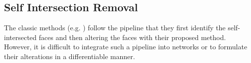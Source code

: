 \subsection{Self Intersection Removal}
The classic methods (e.g. \cite{edgeswap,removeoffset}) follow the pipeline that they first identify the self-intersected faces and then altering the faces with their proposed method. However, it is difficult to integrate such a pipeline into networks or to formulate their alterations in a differentiable manner.\\


